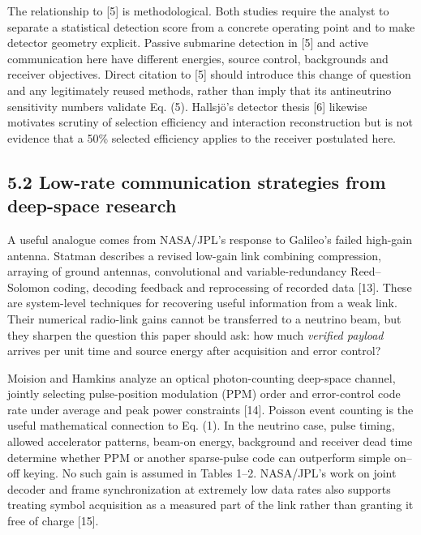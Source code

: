 \documentclass[
]{article}
\begin{document}
The relationship to {[}5{]} is methodological. Both studies require the
analyst to separate a statistical detection score from a concrete
operating point and to make detector geometry explicit. Passive
submarine detection in {[}5{]} and active communication here have
different energies, source control, backgrounds and receiver objectives.
Direct citation to {[}5{]} should introduce this change of question and
any legitimately reused methods, rather than imply that its antineutrino
sensitivity numbers validate Eq. (5). Hallsjö's detector thesis {[}6{]}
likewise motivates scrutiny of selection efficiency and interaction
reconstruction but is not evidence that a 50\% selected efficiency
applies to the receiver postulated here.

\hypertarget{low-rate-communication-strategies-from-deep-space-research}{%
\subsection{5.2 Low-rate communication strategies from deep-space
research}\label{low-rate-communication-strategies-from-deep-space-research}}

A useful analogue comes from NASA/JPL's response to Galileo's failed
high-gain antenna. Statman describes a revised low-gain link combining
compression, arraying of ground antennas, convolutional and
variable-redundancy Reed--Solomon coding, decoding feedback and
reprocessing of recorded data {[}13{]}. These are system-level
techniques for recovering useful information from a weak link. Their
numerical radio-link gains cannot be transferred to a neutrino beam, but
they sharpen the question this paper should ask: how much \emph{verified
payload} arrives per unit time and source energy after acquisition and
error control?

Moision and Hamkins analyze an optical photon-counting deep-space
channel, jointly selecting pulse-position modulation (PPM) order and
error-control code rate under average and peak power constraints
{[}14{]}. Poisson event counting is the useful mathematical connection
to Eq. (1). In the neutrino case, pulse timing, allowed accelerator
patterns, beam-on energy, background and receiver dead time determine
whether PPM or another sparse-pulse code can outperform simple on--off
keying. No such gain is assumed in Tables 1--2. NASA/JPL's work on joint
decoder and frame synchronization at extremely low data rates also
supports treating symbol acquisition as a measured part of the link
rather than granting it free of charge {[}15{]}.
\end{document}
